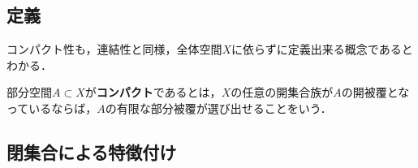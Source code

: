\documentclass[uplatex,dvipdfmx]{jsreport}
\begin{document}
\subsection{定義}

\begin{tcolorbox}[colframe=ForestGreen, colback=ForestGreen!10!white,breakable,colbacktitle=ForestGreen!40!white,coltitle=black,fonttitle=\bfseries\sffamily,
title=]
    コンパクト性も，連結性と同様，全体空間$X$に依らずに定義出来る概念であるとわかる．
\end{tcolorbox}

\begin{definition}
    部分空間$A\subset X$が\textbf{コンパクト}であるとは，$X$の任意の開集合族が$A$の開被覆となっているならば，$A$の有限な部分被覆が選び出せることをいう．
\end{definition}

\subsection{閉集合による特徴付け}
\end{document}
